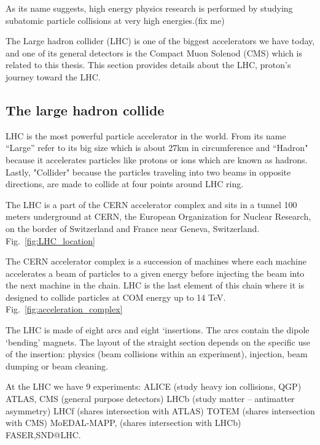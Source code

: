 

As its name suggests, high energy physics research is performed by studying subatomic particle collisions at very high energies.(fix me) 

The Large hadron collider (LHC) is one of the biggest accelerators we have today, and one of its general detectors is the Compact Muon Solenod (CMS) which is related to this thesis. This section provides details about the LHC, proton's journey toward the LHC. %

\subsection{The large hadron collide}

LHC is the most powerful particle accelerator in the world. From its name “Large” refer to its big size which is about 27km in circumference and “Hadron" because it accelerates particles like protons or ions which are known as hadrons. Lastly, "Collider" because the particles traveling into two beams in opposite directions, are made to collide at four points around LHC ring.

The LHC is a part of the CERN accelerator complex and sits in a tunnel 100 meters underground at CERN, the European Organization for Nuclear Research, on the border of Switzerland and France near Geneva, Switzerland. Fig.~\ref{fig:LHC_location}

The CERN accelerator complex is a succession of machines where each machine accelerates a beam of particles to a given energy before injecting the beam into the next machine in the chain. LHC is the last element of this chain where it is designed to collide particles at COM energy up to 14 TeV. Fig.~\ref{fig:acceleration_complex}

The LHC is made of eight arcs and eight ‘insertions. The arcs contain the dipole ‘bending’ magnets. The layout of the straight section depends on the specific use of the insertion: physics (beam collisions within an experiment), injection, beam dumping or beam cleaning.

At the LHC we have 9 experiments: 
ALICE (study heavy ion collisions, QGP)  
ATLAS, CMS  (general purpose detectors)  
LHCb (study matter – antimatter asymmetry) 
 LHCf (shares intersection with ATLAS) 
TOTEM (shares intersection with CMS)  
MoEDAL-MAPP, (shares intersection with LHCb) 
FASER,SND@LHC.


